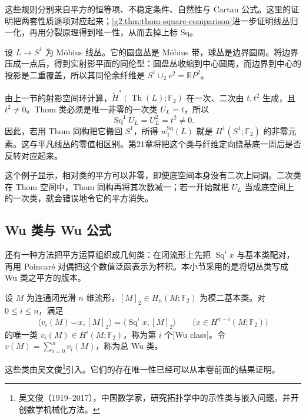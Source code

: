 这些规则分别来自平方的恒等项、不稳定条件、自然性与 Cartan 公式。这里的证明把两套性质逐项对应起来；\cref{g2:thm:thom-square-comparison}进一步证明线丛归一化，再用分裂原理得到唯一性，从而去掉上标 \(\mathrm{Sq}\)。

\begin{example}\label{g2:exm:mobius-thom-square}
	设 \(L\to S^1\) 为 Möbius 线丛。它的圆盘丛是 Möbius 带，球丛是边界圆周。将边界压成一点后，得到实射影平面的同伦型：圆盘丛收缩到中心圆周，而边界到中心的投影是二重覆盖，所以其同伦余纤维是 \(S^1\cup_2 e^2=\mathbb RP^2\)。

	由上一节的射影空间环计算，\(\widetilde H^*(\operatorname{Th}(L);\mathbb F_2)\) 在一次、二次由 \(t,t^2\) 生成，且 \(t^2\ne0\)。Thom 类必须是唯一非零的一次类 \(U_L=t\)，所以
	\[
		\operatorname{Sq}^1U_L=U_L^2=t^2\ne0.
	\]
	因此，若用 Thom 同构把它搬回 \(S^1\)，所得 \(w_1^{\mathrm{Sq}}(L)\) 就是 \(H^1(S^1;\mathbb F_2)\) 的非零元素。这与平凡线丛的零值相区别。第21章将把这个类与纤维定向绕基底一周后是否反转对应起来。
\end{example}

这个例子显示，相对类的平方可以非零，即使底空间本身没有二次上同调。二次类在 Thom 空间中，Thom 同构再将其次数减一；若一开始就把 \(U_L\) 当成底空间上的一次类，就会错误地令它的平方消失。

\subsection{Wu 类与 Wu 公式}
\label{g2:subsec:1304:03}

还有一种方法把平方运算组织成几何类：在闭流形上先把 \(\operatorname{Sq}^i x\) 与基本类配对，再用 Poincaré 对偶把这个数值泛函表示为杯积。本小节采用的是将切丛类写成 Wu 类之平方的版本。

\begin{definition}[Wu 类]\label{g2:def:wu-class}
	设 \(M\) 为连通闭光滑 \(n\) 维流形，\([M]_2\in H_n(M;\mathbb F_2)\) 为模二基本类。对 \(0\le i\le n\)，满足
	\begin{equation}\label{g2:eq:wu-defining-pairing}
		\langle v_i(M)\smile x,[M]_2\rangle
		=\langle\operatorname{Sq}^i x,[M]_2\rangle
		\qquad\bigl(x\in H^{n-i}(M;\mathbb F_2)\bigr)
	\end{equation}
	的唯一类 \(v_i(M)\in H^i(M;\mathbb F_2)\)，称为第 \(i\) 个[Wu class]。令 \(v(M)=\sum_{i=0}^n v_i(M)\)，称为总 Wu 类。
\end{definition}

这些类由吴文俊\footnote{吴文俊（1919--2017），中国数学家，研究拓扑学中的示性类与嵌入问题，并开创数学机械化方法。}引入。它们的存在唯一性已经可以从本卷前面的结果证明。

